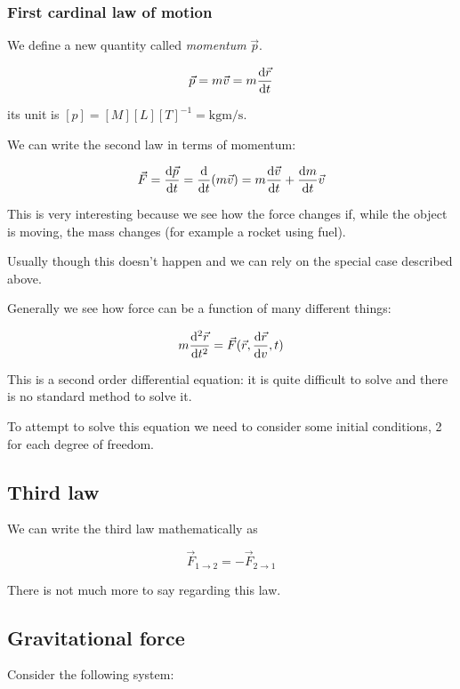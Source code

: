 \documentclass[10pt]{extarticle}
\begin{document}
\subsubsection{First cardinal law of motion}

We define a new quantity called \textit{momentum} $\vec p$.

$$
  \vec p = m \vec v = m \dv{\vec r}{t}
$$

its unit is $[p] = [M][L][T]^{-1} = \si{\kilogram \meter \per \second}$.

We can write the second law in terms of momentum:

$$
  \vec F = \dv{\vec p}{t} = \dv{t} (m \vec v) = m \dv{\vec v}{t} + \dv{m}{t} \vec v
$$

This is very interesting because we see how the force changes if, while the object is moving, the mass changes (for example a rocket using fuel).

Usually though this doesn't happen and we can rely on the special case described above.

Generally we see how force can be a function of many different things:

$$
  m \dv[2]{\vec r}{t} = \vec F(\vec r, \dv{\vec r}{v}, t)
$$

This is a second order differential equation: it is quite difficult to solve and there is no standard method to solve it.

To attempt to solve this equation we need to consider some initial conditions, 2 for each degree of freedom.

\subsection{Third law}

We can write the third law mathematically as

$$
  \vec{F}_{1 \to 2} = - \vec{F}_{2 \to 1}
$$

There is not much more to say regarding this law.

\subsection{Gravitational force}

Consider the following system:
\end{document}
